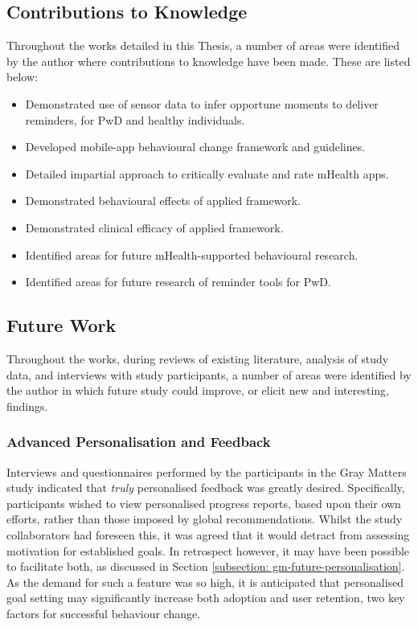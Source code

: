 \subsection{Contributions to Knowledge}
Throughout the works detailed in this Thesis, a number of areas were identified by the author where contributions to knowledge have been made. These are listed below:
\begin{itemize}
	\item Demonstrated use of sensor data to infer opportune moments to deliver reminders, for PwD and healthy individuals.
	\item Developed mobile-app behavioural change framework and guidelines.
	\item Detailed impartial approach to critically evaluate and rate mHealth apps.
	\item Demonstrated behavioural effects of applied framework.
	\item Demonstrated clinical efficacy of applied framework.
	\item Identified areas for future mHealth-supported behavioural research.
	\item Identified areas for future research of reminder tools for PwD.
\end{itemize}

\subsection{Future Work}
Throughout the works, during reviews of existing literature, analysis of study data, and interviews with study participants, a number of areas were identified by the author in which future study could improve, or elicit new and interesting, findings.

\subsubsection{Advanced Personalisation and Feedback}
Interviews and questionnaires performed by the participants in the Gray Matters study indicated that \textit{truly} personalised feedback was greatly desired. Specifically, participants wished to view personalised progress reports, based upon their own efforts, rather than those imposed by global recommendations. Whilst the study collaborators had foreseen this, it was agreed that it would detract from assessing motivation for established goals. In retrospect however, it may have been possible to facilitate both, as discussed in Section \ref{subsection: gm-future-personalisation}. As the demand for such a feature was so high, it is anticipated that personalised goal setting may significantly increase both adoption and user retention, two key factors for successful behaviour change.

